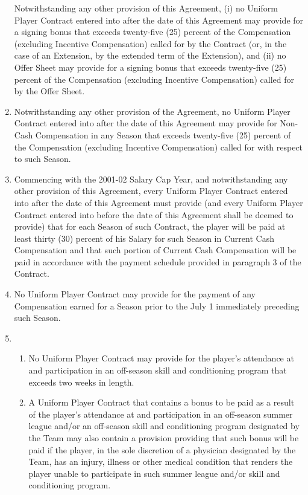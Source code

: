 \documentclass[
]{book}
\providecommand{\tightlist}{%
  \setlength{\itemsep}{0pt}\setlength{\parskip}{0pt}}
\begin{document}
\begin{enumerate}
  Notwithstanding any other provision of this Agreement, (i) no Uniform Player Contract entered into after the date of this Agreement may provide for a signing bonus that exceeds twenty-five (25) percent of the Compensation (excluding Incentive Compensation) called for by the Contract (or, in the case of an Extension, by the extended term of the Extension), and (ii) no Offer Sheet may provide for a signing bonus that exceeds twenty-five (25) percent of the Compensation (excluding Incentive Compensation) called for by the Offer Sheet.
\item
  Notwithstanding any other provision of the Agreement, no Uniform Player Contract entered into after the date of this Agreement may provide for Non-Cash Compensation in any Season that exceeds twenty-five (25) percent of the Compensation (excluding Incentive Compensation) called for with respect to such Season.
\item
  Commencing with the 2001-02 Salary Cap Year, and notwithstanding any other provision of this Agreement, every Uniform Player Contract entered into after the date of this Agreement must provide (and every Uniform Player Contract entered into before the date of this Agreement shall be deemed to provide) that for each Season of such Contract, the player will be paid at least thirty (30) percent of his Salary for such Season in Current Cash Compensation and that such portion of Current Cash Compensation will be paid in accordance with the payment schedule provided in paragraph 3 of the Contract.
\item
  No Uniform Player Contract may provide for the payment of any Compensation earned for a Season prior to the July 1 immediately preceding such Season.
\item
  \begin{enumerate}
  \def\labelenumii{(\roman{enumii})}
  \tightlist
  \item
    No Uniform Player Contract may provide for the player's attendance at and participation in an off-season skill and conditioning program that exceeds two weeks in length.
  \item
    A Uniform Player Contract that contains a bonus to be paid as a result of the player's attendance at and participation in an off-season summer league and/or an off-season skill and conditioning program designated by the Team may also contain a provision providing that such bonus will be paid if the player, in the sole discretion of a physician designated by the Team, has an injury, illness or other medical condition that renders the player unable to participate in such summer league and/or skill and conditioning program.
  \end{enumerate}
\end{enumerate}
\end{document}
